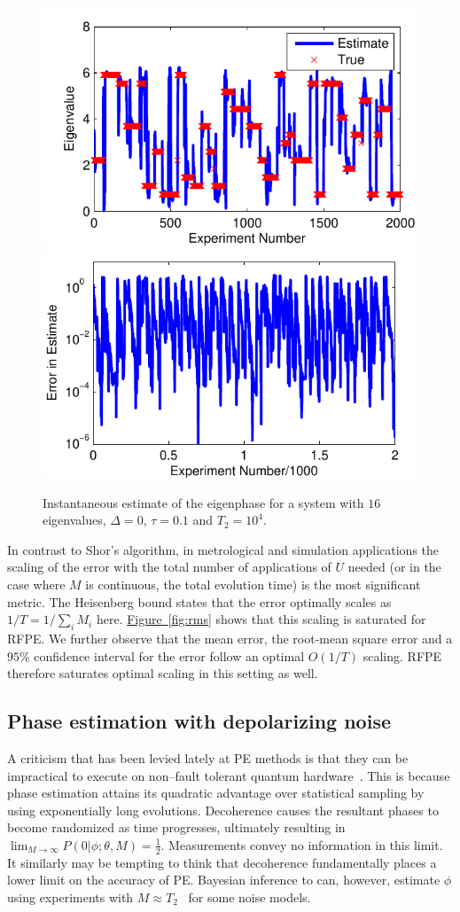 \documentclass[aps,pra,amsmath,twocolumn,amssymb,superscriptaddress]{revtex4-1}
\newcommand{\fig}[1]{\hyperref[fig:#1]{Figure~\ref*{fig:#1}}}
\begin{document}
\begin{figure}
    \begin{centering}
        \includegraphics[width=0.4\linewidth]{Errtrack1.pdf}
        \hspace{5mm}
        \includegraphics[width=0.4\linewidth]{Errtrack2.pdf}
    \end{centering}
    \caption{\label{fig:Errplot}
        Instantaneous estimate of the eigenphase  for a system with $16$ eigenvalues, $\Delta=0$, $\tau=0.1$ and $T_2=10^4$.
    }
\end{figure}

In contrast to Shor's algorithm, in metrological and simulation applications the scaling of the error with the total number of applications of $U$ needed  (or in the case where $M$ is continuous, the total evolution time) is the most significant metric.
The Heisenberg bound states that the error optimally scales as $1/T=1/\sum_i M_i$ here.
\fig{rms} shows that this scaling is saturated for RFPE.  We further observe that the mean error, the
root-mean square error and a $95\%$ confidence interval for the error follow an optimal $O(1/T)$ scaling.
RFPE therefore saturates optimal scaling in this setting as well.




\subsection{Phase estimation with depolarizing noise}
A criticism that has been levied lately at PE methods is that they can be impractical to execute on non--fault tolerant quantum hardware~\cite{PMS+14,MBL+14,WHT15}.  This is because phase estimation attains its quadratic advantage over statistical sampling by using exponentially long evolutions.  Decoherence causes the resultant phases to become randomized as time progresses, ultimately resulting in
$\lim_{M\rightarrow \infty} P(0|\phi;\theta,M) = \frac{1}{2}$.
Measurements convey no information in this limit.  It similarly may be tempting to think that decoherence fundamentally places a lower limit on the accuracy of PE.   Bayesian inference to can, however, estimate $\phi$ using experiments with $M \approx T_2$~\cite{granade_robust_2012} for some noise models.  
\end{document}
